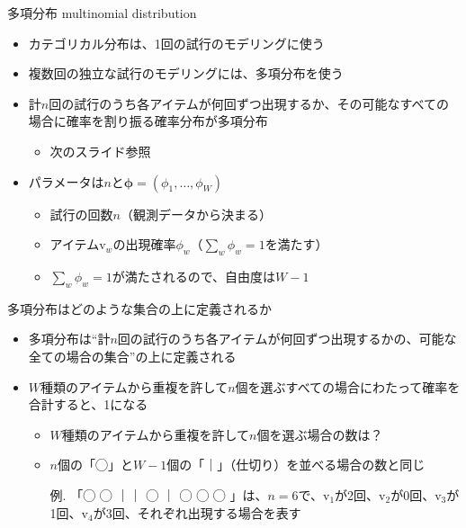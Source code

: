 \documentclass[aspectratio=169,unicode,dvipdfmx,14pt]{beamer}
\begin{document}
\begin{frame}{多項分布 multinomial distribution}
\begin{itemize}
\item カテゴリカル分布は、1回の試行のモデリングに使う
\item 複数回の独立な試行のモデリングには、多項分布を使う
\item 計$n$回の試行のうち各アイテムが何回ずつ出現するか、その可能なすべての場合に確率を割り振る確率分布が多項分布
\begin{itemize}
\item 次のスライド参照
\end{itemize}
\item パラメータは$n$と$\bm{\phi}=(\phi_1,\ldots,\phi_W)$
\begin{itemize}
\item 試行の回数$n$（観測データから決まる）
\item アイテム$\mbox{v}_w$の出現確率$\phi_w$（$\sum_w \phi_w = 1$を満たす）
\item $\sum_w \phi_w=1$が満たされるので、自由度は$W-1$
\end{itemize}
\end{itemize}
\end{frame}

\begin{frame}{多項分布はどのような集合の上に定義されるか}
\begin{itemize}
\item 多項分布は``計$n$回の試行のうち各アイテムが何回ずつ出現するかの、可能な全ての場合の集合''の上に定義される
\item $W$種類のアイテムから重複を許して$n$個を選ぶすべての場合にわたって確率を合計すると、1になる
\begin{itemize}
\item $W$種類のアイテムから重複を許して$n$個を選ぶ場合の数は？
\item $n$個の「◯」と$W-1$個の「｜」（仕切り）を並べる場合の数と同じ
\item[例.] 「◯ ◯ ｜｜ ◯ ｜ ◯ ◯ ◯ 」は、$n=6$で、$\mbox{v}_1$が2回、$\mbox{v}_2$が0回、$\mbox{v}_3$が1回、$\mbox{v}_4$が3回、それぞれ出現する場合を表す
\end{itemize}
\end{itemize}
\end{frame}
\end{document}

